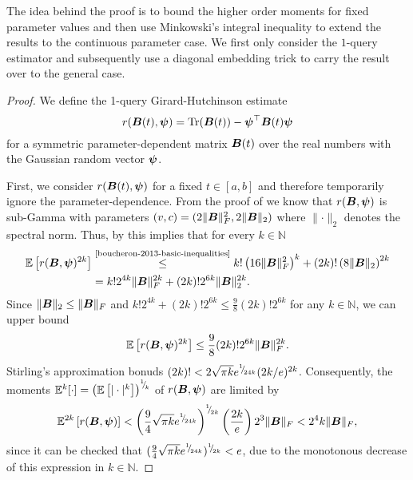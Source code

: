 \documentclass[12pt]{article}
\begin{document}
The idea behind the proof is to bound the higher order moments for fixed parameter values and then use Minkowski's integral inequality to extend the results to the continuous parameter case. We first only consider the $1$-query estimator and subsequently use a diagonal embedding trick to carry the result over to the general case.
\begin{proof} 
    We define the 1-query Girard-Hutchinson estimate 
    \begin{equation}
        r(\boldsymbol{B}(t), \boldsymbol{\psi}) = \operatorname{Tr}(\boldsymbol{B}(t)) - \boldsymbol{\psi}^{\top} \boldsymbol{B}(t) \boldsymbol{\psi}
    \end{equation}
    for a symmetric parameter-dependent matrix $\boldsymbol{B}(t)$ over the real numbers with the Gaussian random vector $\boldsymbol{\psi}$.

    First, we consider $r(\boldsymbol{B}(t), \boldsymbol{\psi})$ for a fixed $t \in [a,b]$ and therefore temporarily ignore the parameter-dependence. From the proof of \cite[lemma 3]{cortinovis-2022-randomized-trace} we know that $r(\boldsymbol{B}, \boldsymbol{\psi})$ is sub-Gamma with parameters $(v, c) = (2 \lVert \boldsymbol{B} \rVert _F^2, 2 \lVert \boldsymbol{B} \rVert _2)$ where $\lVert \cdot \rVert _2$ denotes the spectral norm. Thus, by \cite[theorem 2.3]{boucheron-2013-basic-inequalities} this implies that for every $k \in \mathbb{N}$
    \begin{align}
        \mathbb{E}\left[ r(\mtx{B}, \vct{\psi})^{2 k} \right]
        &\stackrel{\text{\cite{boucheron-2013-basic-inequalities}}}{\leq} k! \left( 16 \lVert \mtx{B} \rVert _F^2 \right)^k + (2 k)! \left( 8 \lVert \mtx{B} \rVert _2 \right)^{2 k} \notag \\
        &= k! 2^{4 k} \lVert \mtx{B} \rVert _F^{2 k} + (2 k)! 2^{6 k} \lVert \mtx{B} \rVert _2^{2 k}.
    \end{align}
    Since $\lVert \boldsymbol{B} \rVert _2 \leq \lVert \boldsymbol{B} \rVert _F$ and $k! 2^{4 k} + (2 k)! 2^{6 k} \leq \frac{9}{8}(2 k)! 2^{6 k}$ for any $k \in \mathbb{N}$, we can upper bound 
    \begin{equation}
        \mathbb{E}\left[ r(\boldsymbol{B}, \boldsymbol{\psi})^{2 k} \right] \leq \frac{9}{8} (2 k)! 2^{6 k} \lVert \boldsymbol{B} \rVert _F^{2k}.
    \end{equation}
    Stirling's approximation \cite{robbins-1955-remark-stirling} bonuds $(2 k)! < 2 \sqrt{\pi k}  e^{{}^{1}{\mskip -5mu/\mskip -3mu}_{24 k}} ( 2 k / e )^{2 k}$. Consequently, the moments $\mathbb{E}^{k}[\cdot] = \left(\mathbb{E}\left[ | \cdot |^{k} \right] \right)^{{}^{1}{\mskip -5mu/\mskip -3mu}_{k}}$ of $r(\boldsymbol{B}, \boldsymbol{\psi})$ are limited by
    \begin{equation}
        \mathbb{E}^{2k}\left[ r(\boldsymbol{B}, \boldsymbol{\psi}) \right]
        < \left( \frac{9}{4} \sqrt{\pi k} e^{{}^{1}{\mskip -5mu/\mskip -3mu}_{24 k}} \right)^{{}^{1}{\mskip -5mu/\mskip -3mu}_{2k}} \left( \frac{2 k}{e}\right) 2^{3} \lVert \boldsymbol{B} \rVert _F < 2^4 k \lVert \boldsymbol{B} \rVert _F,
        \label{equ:hutchinson-trace-onequery-fixed}
    \end{equation}
    since it can be checked that $(\frac{9}{4} \sqrt{\pi k} e^{{}^{1}{\mskip -5mu/\mskip -3mu}_{24 k}})^{{}^{1}{\mskip -5mu/\mskip -3mu}_{2k}} < e$, due to the monotonous decrease of this expression in $k \in \mathbb{N}$.


\end{proof}
\end{document}
